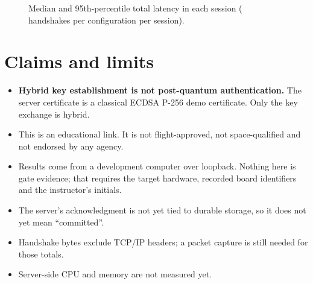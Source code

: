\documentclass[11pt,a4paper]{article}
\begin{document}
\begin{figure}[h]
\centering
{}
\caption{Median and 95th-percentile total latency in each session (\NPerSession{} handshakes per
configuration per session).}
\label{fig:sessions}
\end{figure}

\section{Claims and limits}

\begin{itemize}\setlength\itemsep{0pt}
\item \textbf{Hybrid key establishment is not post-quantum authentication.} The server
      certificate is a classical ECDSA P-256 demo certificate. Only the key exchange is hybrid.
\item This is an educational link. It is not flight-approved, not space-qualified and not
      endorsed by any agency.
\item Results come from a development computer over loopback. Nothing here is gate evidence;
      that requires the target hardware, recorded board identifiers and the instructor's initials.
\item The server's acknowledgment is not yet tied to durable storage, so it does not yet mean
      ``committed''.
\item Handshake bytes exclude TCP/IP headers; a packet capture is still needed for those totals.
\item Server-side CPU and memory are not measured yet.
\end{itemize}
\end{document}

